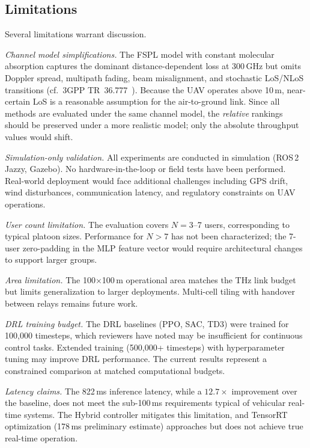 \documentclass[journal]{IEEEtran}
\begin{document}
\subsection{Limitations}

Several limitations warrant discussion.

\emph{Channel model simplifications.} The FSPL model with constant molecular absorption captures the dominant distance-dependent loss at 300\,GHz but omits Doppler spread, multipath fading, beam misalignment, and stochastic LoS/NLoS transitions (cf.\ 3GPP TR~36.777~\cite{3gpp36777}). Because the UAV operates above 10\,m, near-certain LoS is a reasonable assumption for the air-to-ground link. Since all methods are evaluated under the same channel model, the \emph{relative} rankings should be preserved under a more realistic model; only the absolute throughput values would shift.

\emph{Simulation-only validation.} All experiments are conducted in simulation (ROS\,2 Jazzy, Gazebo). No hardware-in-the-loop or field tests have been performed. Real-world deployment would face additional challenges including GPS drift, wind disturbances, communication latency, and regulatory constraints on UAV operations.

\emph{User count limitation.} The evaluation covers $N = 3$--7 users, corresponding to typical platoon sizes. Performance for $N > 7$ has not been characterized; the 7-user zero-padding in the MLP feature vector would require architectural changes to support larger groups.

\emph{Area limitation.} The 100$\times$100\,m operational area matches the THz link budget but limits generalization to larger deployments. Multi-cell tiling with handover between relays remains future work.

\emph{DRL training budget.} The DRL baselines (PPO, SAC, TD3) were trained for 100{,}000 timesteps, which reviewers have noted may be insufficient for continuous control tasks. Extended training (500{,}000+ timesteps) with hyperparameter tuning may improve DRL performance. The current results represent a constrained comparison at matched computational budgets.

\emph{Latency claims.} The 822\,ms inference latency, while a $12.7\times$ improvement over the baseline, does not meet the sub-100\,ms requirements typical of vehicular real-time systems. The Hybrid controller mitigates this limitation, and TensorRT optimization (178\,ms preliminary estimate) approaches but does not achieve true real-time operation.
\end{document}
